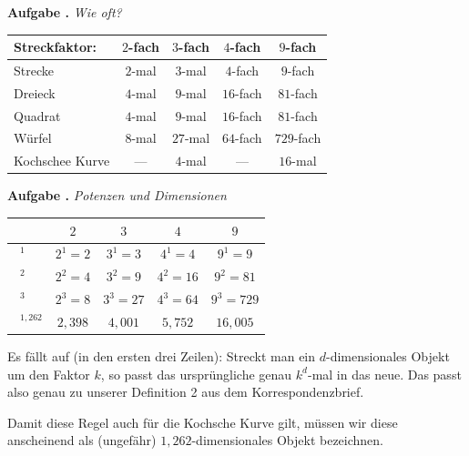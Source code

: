 \documentclass[a4paper,ngerman,12pt]{scrartcl}
\theoremstyle{definition}
\theoremstyle{plain}
\theoremstyle{remark}
\newlength{\aufgabenskip}
\newcounter{aufgabennummer}
\newenvironment{aufgabe}[1]{
  \addtocounter{aufgabennummer}{1}
  \textbf{Aufgabe \theaufgabennummer.} \emph{#1} \par
}{\vspace{\aufgabenskip}}
\begin{document}
\newpage

\begin{aufgabe}{Wie oft?} \label{aufgabe:Wie_oft}
\begin{center}
	\renewcommand{\arraystretch}{2}
	\begin{tabular}{l||c|c|c|c}
		Streckfaktor:& $2$-fach & $3$-fach & $4$-fach & $9$-fach \\\hline\hline
		Strecke      & $2$-mal	& $3$-mal  & $4$-fach & $9$-fach \\\hline
		Dreieck      & $4$-mal  & $9$-mal  & $16$-fach & $81$-fach \\\hline
		Quadrat      & $4$-mal  & $9$-mal  & $16$-fach & $81$-fach  \\\hline
		Würfel       & $8$-mal  & $27$-mal  & $64$-fach & $729$-fach  \\\hline
		Kochschee Kurve & ---   & $4$-mal  & ---      & $16$-mal  \\      	
	\end{tabular}
\end{center}
\end{aufgabe}

\begin{aufgabe}{Potenzen und Dimensionen}
\begin{center}
	\renewcommand{\arraystretch}{2}
	\begin{tabular}{l||c|c|c|c}
				      & $2$ & $3$ & $4$ & $9$ \\\hline\hline
		$\boxed{\phantom{1}}^1$  & $2^1=2$	& $3^1=3$ & $4^1=4$  & $9^1=9$ \\\hline
		$\boxed{\phantom{1}}^2$  & $2^2=4$	& $3^2=9$ & $4^2=16$ & $9^2=81$\\\hline
		$\boxed{\phantom{1}}^3$  & $2^3=8$	& $3^3=27$ & $4^3=64$ & $9^3=729$ \\\hline
		$\boxed{\phantom{1}}^{1,262}$  & $2,398$ & $4,001$ & $5,752$ & $16,005$     	
	\end{tabular}
\end{center}

Es fällt auf (in den ersten drei Zeilen): Streckt man ein $d$-dimensionales Objekt um den Faktor $k$, so passt das ursprüngliche genau $k^d$-mal in das neue. Das passt also genau zu unserer Definition 2 aus dem Korrespondenzbrief.

Damit diese Regel auch für die Kochsche Kurve gilt, müssen wir diese anscheinend als (ungefähr) $1,262$-dimensionales Objekt bezeichnen.

\end{aufgabe}
\end{document}

